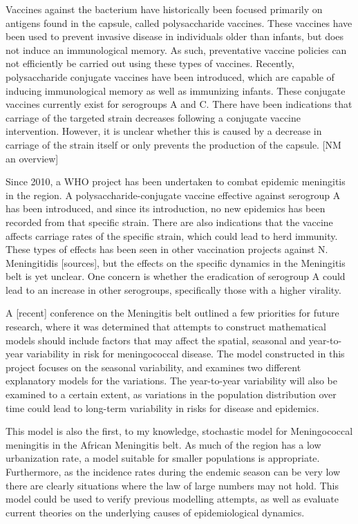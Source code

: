 \documentclass[10pt,a4paper]{article}
\begin{document}
Vaccines against the bacterium have historically been focused primarily on antigens found in the capsule, called polysaccharide vaccines. These vaccines have been used to prevent invasive disease in individuals older than infants, but does not induce an immunological memory. As such, preventative vaccine policies can not efficiently be carried out using these types of vaccines. Recently, polysaccharide conjugate vaccines have been introduced, which are capable of inducing immunological memory as well as immunizing infants. These conjugate vaccines currently exist for serogroups A and C. There have been indications that carriage of the targeted strain decreases following a conjugate vaccine intervention. However, it is unclear whether this is caused by a decrease in carriage of the strain itself or only prevents the production of the capsule. [NM an overview]

Since 2010, a WHO project has been undertaken to combat epidemic meningitis in the region. A polysaccharide-conjugate vaccine effective against serogroup A has been introduced, and since its introduction, no new epidemics has been recorded from that specific strain. There are also indications that the vaccine affects carriage rates of the specific strain, which could lead to herd immunity. These types of effects has been seen in other vaccination projects against N. Meningitidis [sources], but the effects on the specific dynamics in the Meningitis belt is yet unclear. One concern is whether the eradication of serogroup A could lead to an increase in other serogroups, specifically those with a higher virality.

A [recent] conference on the Meningitis belt outlined a few priorities for future research, where it was determined that attempts to construct mathematical models should include factors that may affect the spatial, seasonal and year-to-year variability in risk for meningococcal disease. The model constructed in this project focuses on the seasonal variability, and examines two different explanatory models for the variations. The year-to-year variability will also be examined to a certain extent, as variations in the population distribution over time could lead to long-term variability in risks for disease and epidemics.

This model is also the first, to my knowledge, stochastic model for Meningococcal meningitis in the African Meningitis belt. As much of the region has a low urbanization rate, a model suitable for smaller populations is appropriate. Furthermore, as the incidence rates during the endemic season can be very low there are clearly situations where the law of large numbers may not hold. This model could be used to verify previous modelling attempts, as well as evaluate current theories on the underlying causes of epidemiological dynamics.
\end{document}
